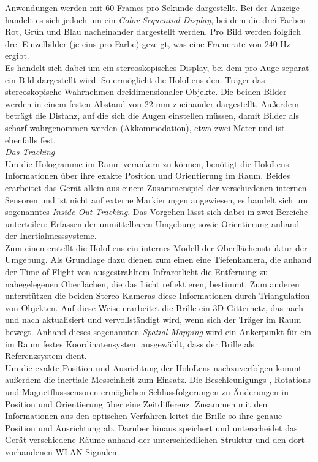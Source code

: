 Anwendungen werden mit 60 Frames pro Sekunde dargestellt. Bei der Anzeige handelt es sich jedoch um ein \textit{Color Sequential Display}, bei dem die drei Farben Rot, Grün und Blau nacheinander dargestellt werden. Pro Bild werden folglich drei Einzelbilder (je eins pro Farbe) gezeigt, was eine Framerate von 240 Hz ergibt.\\

Es handelt sich dabei um ein stereoskopisches Display, bei dem pro Auge separat ein Bild dargestellt wird. So ermöglicht die HoloLens dem Träger das stereoskopische Wahrnehmen dreidimensionaler Objekte. Die beiden Bilder werden in einem festen Abstand von 22 mm zueinander dargestellt. Außerdem beträgt die Distanz, auf die sich die Augen einstellen müssen, damit Bilder als scharf wahrgenommen werden (Akkommodation), etwa zwei Meter und ist ebenfalls fest.\\

\vspace{4px}
\textit{Das Tracking}\\
Um die Hologramme im Raum verankern zu können, benötigt die HoloLens Informationen über ihre exakte Position und Orientierung im Raum. Beides erarbeitet das Gerät allein aus einem Zusammenspiel der verschiedenen internen Sensoren und ist nicht auf externe Markierungen angewiesen, es handelt sich um sogenanntes \textit{Inside-Out Tracking}. Das Vorgehen lässt sich dabei in zwei Bereiche unterteilen: Erfassen der unmittelbaren Umgebung sowie Orientierung anhand der Inertialmesssysteme.\\

Zum einen erstellt die HoloLens ein internes Modell der Oberflächenstruktur der Umgebung. Als Grundlage dazu dienen zum einen eine Tiefenkamera, die anhand der Time-of-Flight von ausgestrahltem Infrarotlicht die Entfernung zu nahegelegenen Oberflächen, die das Licht reflektieren, bestimmt. Zum anderen unterstützen die beiden Stereo-Kameras diese Informationen durch Triangulation von Objekten. Auf diese Weise erarbeitet die Brille ein 3D-Gitternetz, das nach und nach aktualisiert und vervollständigt wird, wenn sich der Träger im Raum bewegt. Anhand dieses sogenannten \textit{Spatial Mapping} wird ein Ankerpunkt für ein im Raum festes Koordinatensystem ausgewählt, dass der Brille als Referenzsystem dient.\\

Um die exakte Position und Ausrichtung der HoloLens nachzuverfolgen kommt außerdem die inertiale Messeinheit zum Einsatz. Die Beschleunigungs-, Rotations- und Magnetflusssensoren ermöglichen Schlussfolgerungen zu Änderungen in Position und Orientierung über eine Zeitdifferenz. Zusammen mit den Informationen aus den optischen Verfahren leitet die Brille so ihre genaue Position und Ausrichtung ab. Darüber hinaus speichert und unterscheidet das Gerät verschiedene Räume anhand der unterschiedlichen Struktur und den dort vorhandenen WLAN Signalen.\\


